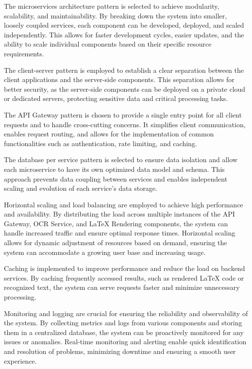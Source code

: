\documentclass{article}
\begin{document}
The microservices architecture pattern is selected to achieve modularity, scalability, and maintainability. By breaking down the system into smaller, loosely coupled services, each component can be developed, deployed, and scaled independently. This allows for faster development cycles, easier updates, and the ability to scale individual components based on their specific resource requirements.

The client-server pattern is employed to establish a clear separation between the client applications and the server-side components. This separation allows for better security, as the server-side components can be deployed on a private cloud or dedicated servers, protecting sensitive data and critical processing tasks.

The API Gateway pattern is chosen to provide a single entry point for all client requests and to handle cross-cutting concerns. It simplifies client communication, enables request routing, and allows for the implementation of common functionalities such as authentication, rate limiting, and caching.

The database per service pattern is selected to ensure data isolation and allow each microservice to have its own optimized data model and schema. This approach prevents data coupling between services and enables independent scaling and evolution of each service's data storage.

Horizontal scaling and load balancing are employed to achieve high performance and availability. By distributing the load across multiple instances of the API Gateway, OCR Service, and LaTeX Rendering components, the system can handle increased traffic and ensure optimal response times. Horizontal scaling allows for dynamic adjustment of resources based on demand, ensuring the system can accommodate a growing user base and increasing usage.

Caching is implemented to improve performance and reduce the load on backend services. By caching frequently accessed results, such as rendered LaTeX code or recognized text, the system can serve requests faster and minimize unnecessary processing.

Monitoring and logging are crucial for ensuring the reliability and observability of the system. By collecting metrics and logs from various components and storing them in a centralized database, the system can be proactively monitored for any issues or anomalies. Real-time monitoring and alerting enable quick identification and resolution of problems, minimizing downtime and ensuring a smooth user experience.
\end{document}

